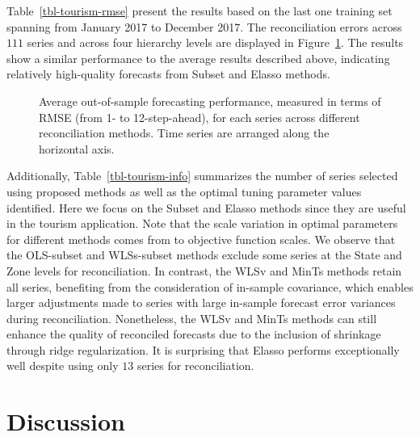 \documentclass[
  11pt]{article}
\theoremstyle{plain}
\theoremstyle{remark}
\begin{document}
Table~\ref{tbl-tourism-rmse} present the results based on the last one
training set spanning from January 2017 to December 2017. The
reconciliation errors across \(111\) series and across four hierarchy
levels are displayed in Figure~\ref{fig-tourism-rmse}. The results show
a similar performance to the average results described above, indicating
relatively high-quality forecasts from Subset and Elasso methods.

\begin{figure}[!t]


\caption{\label{fig-tourism-rmse}Average out-of-sample forecasting
performance, measured in terms of RMSE (from 1- to 12-step-ahead), for
each series across different reconciliation methods. Time series are
arranged along the horizontal axis.}

\end{figure}%

Additionally, Table~\ref{tbl-tourism-info} summarizes the number of
series selected using proposed methods as well as the optimal tuning
parameter values identified. Here we focus on the Subset and Elasso
methods since they are useful in the tourism application. Note that the
scale variation in optimal parameters for different methods comes from
to objective function scales. We observe that the OLS-subset and
WLSs-subset methods exclude some series at the State and Zone levels for
reconciliation. In contrast, the WLSv and MinTs methods retain all
series, benefiting from the consideration of in-sample covariance, which
enables larger adjustments made to series with large in-sample forecast
error variances during reconciliation. Nonetheless, the WLSv and MinTs
methods can still enhance the quality of reconciled forecasts due to the
inclusion of shrinkage through ridge regularization. It is surprising
that Elasso performs exceptionally well despite using only \(13\) series
for reconciliation.

\section{Discussion}\label{sec-discussion}

\end{document}
